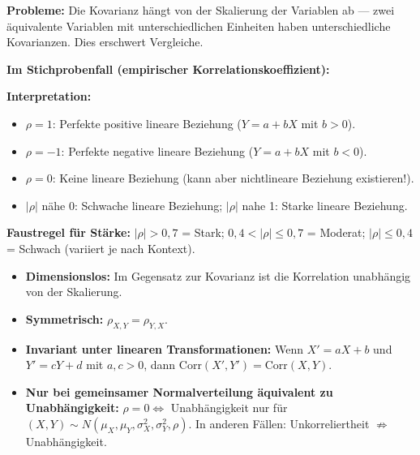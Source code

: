 \textbf{Probleme:} Die Kovarianz hängt von der Skalierung der Variablen ab — zwei äquivalente Variablen mit unterschiedlichen Einheiten haben unterschiedliche Kovarianzen. Dies erschwert Vergleiche.


\textbf{Im Stichprobenfall (empirischer Korrelationskoeffizient):}

\textbf{Interpretation:}
\begin{itemize}[leftmargin=1.5em]
    \item $\rho = 1$: Perfekte positive lineare Beziehung ($Y = a + bX$ mit $b > 0$).
    \item $\rho = -1$: Perfekte negative lineare Beziehung ($Y = a + bX$ mit $b < 0$).
    \item $\rho = 0$: Keine lineare Beziehung (kann aber nichtlineare Beziehung existieren!).
    \item $|\rho|$ nähe 0: Schwache lineare Beziehung; $|\rho|$ nahe 1: Starke lineare Beziehung.
\end{itemize}

\textbf{Faustregel für Stärke:} $|\rho| > 0{,}7$ = Stark; $0{,}4 < |\rho| \leq 0{,}7$ = Moderat; $|\rho| \leq 0{,}4$ = Schwach (variiert je nach Kontext).

\begin{itemize}[leftmargin=1.5em]
    \item \textbf{Dimensionslos:} Im Gegensatz zur Kovarianz ist die Korrelation unabhängig von der Skalierung.
    \item \textbf{Symmetrisch:} $\rho_{X,Y} = \rho_{Y,X}$.
    \item \textbf{Invariant unter linearen Transformationen:} Wenn $X' = aX + b$ und $Y' = cY + d$ mit $a, c > 0$, dann $\text{Corr}(X', Y') = \text{Corr}(X, Y)$.
    \item \textbf{Nur bei gemeinsamer Normalverteilung äquivalent zu Unabhängigkeit:} $\rho = 0 \Leftrightarrow$ Unabhängigkeit nur für $(X,Y) \sim N(\mu_X, \mu_Y, \sigma_X^2, \sigma_Y^2, \rho)$. In anderen Fällen: Unkorreliertheit $\not\Rightarrow$ Unabhängigkeit.
\end{itemize}

